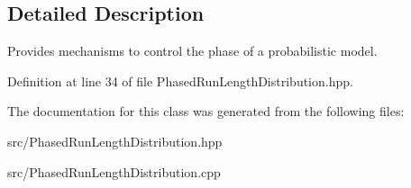 \subsection{Detailed Description}
Provides mechanisms to control the phase of a probabilistic model. 

Definition at line 34 of file Phased\+Run\+Length\+Distribution.\+hpp.



The documentation for this class was generated from the following files\+:\begin{DoxyCompactItemize}
\item 
src/Phased\+Run\+Length\+Distribution.\+hpp\item 
src/Phased\+Run\+Length\+Distribution.\+cpp\end{DoxyCompactItemize}
